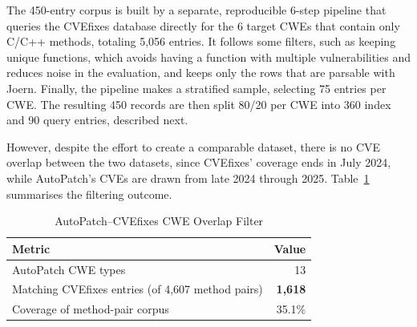 The 450-entry corpus is built by a separate, reproducible 6-step pipeline that queries the CVEfixes database directly for the 6 target CWEs that contain only C/C++ methods, totaling 5,056 entries. It follows some filters, such as keeping unique functions, which avoids having a function with multiple vulnerabilities and reduces noise in the evaluation, and keeps only the rows that are parsable with Joern. Finally, the pipeline makes a stratified sample, selecting 75 entries per CWE. 
The resulting 450 records are then split 80/20 per CWE into 360 index and 90 query entries, described next. 



However, despite the effort to create a comparable dataset, there is no CVE overlap between the two datasets, since CVEfixes' coverage ends in July 2024, while
AutoPatch's CVEs are drawn from late 2024 through 2025. Table~\ref{tab:overlap_filter} summarises the filtering outcome.

 
\begin{table}[htbp]
\centering
\caption{AutoPatch--CVEfixes CWE Overlap Filter}
\label{tab:overlap_filter}
\begin{tabular}{lr}
\toprule
\textbf{Metric} & \textbf{Value} \\
\midrule
AutoPatch CWE types & 13 \\ %
Matching CVEfixes entries (of 4,607 method pairs) & \textbf{1,618} \\
Coverage of method-pair corpus & 35.1\% \\
\bottomrule
\end{tabular}
\end{table}


